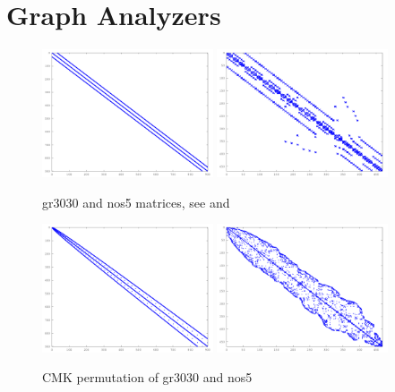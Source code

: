 \chapter{Graph Analyzers}
\label{graph-analyzers}

\begin{figure}[!ht]
\centering
\includegraphics[width=0.45\textwidth]{./fig/perm/gr_30_30_org.pdf}
\includegraphics[width=0.45\textwidth]{./fig/perm/nos5_org.pdf}
\caption{gr3030 and nos5 matrices, see \cite{gr3030mtx} and \cite{nos5mtx}}
\label{gr3030}
\end{figure}

\begin{figure}[!ht]
\centering
\includegraphics[width=0.45\textwidth]{./fig/perm/gr_30_30_cmk.pdf}
\includegraphics[width=0.45\textwidth]{./fig/perm/nos5_cmk.pdf}
\caption{CMK permutation of gr3030 and nos5}
\end{figure}

